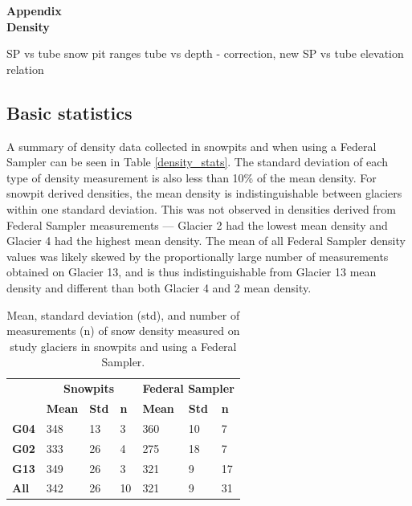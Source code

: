 \documentclass[12pt]{article}
\begin{document}

\begin{center}
\Large \textbf{Appendix\\ Density}
\end{center}

SP vs tube
snow pit ranges
tube vs depth - correction, new SP vs tube
elevation relation



\subsection*{Basic statistics}

A summary of density data collected in snowpits and when using a Federal Sampler can be seen in Table \ref{density_stats}. The standard deviation of each type of density measurement is also less than 10\% of the mean density. For snowpit derived densities, the mean density is indistinguishable between glaciers within one standard deviation. This was not observed in densities derived from Federal Sampler measurements --- Glacier 2 had the lowest mean density and Glacier 4 had the highest mean density. The mean of all Federal Sampler density values was likely skewed by the proportionally large number of measurements obtained on Glacier 13, and is thus indistinguishable from Glacier 13 mean density and different than both Glacier 4 and 2 mean density. 

\begin{table}[]
\centering
\caption{Mean, standard deviation (std), and number of measurements (n) of snow density measured on study glaciers in snowpits and using a Federal Sampler. }
\label{tab:density_stats}
\begin{tabular}{lllllll}
\begin{tabular}{ccccccc}
\multirow{2}{*}{\textbf{Glacier}} & \multicolumn{3}{c}{\textbf{Snowpits}}     & \multicolumn{3}{c}{\textbf{Federal Sampler}} \\ \cline{2-7} 
                                  & \textbf{Mean} & \textbf{Std} & \textbf{n} & \textbf{Mean}  & \textbf{Std}  & \textbf{n}  \\ \hline
\textbf{G04}                      & 348           & 13           & 3          & 360            & 10            & 7           \\
\textbf{G02}                      & 333           & 26           & 4          & 275            & 18            & 7           \\
\textbf{G13}                      & 349           & 26           & 3         & 321            & 9             & 17          \\
\textbf{All}                      & 342           & 26           & 10         & 321            & 9             & 31         
\end{tabular}
\end{table}
\end{document}

